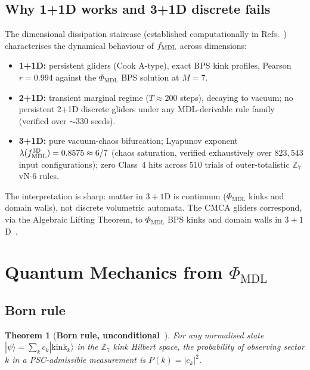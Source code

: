 \documentclass[11pt]{article}
\newtheorem{theorem}{Theorem}[section]
\theoremstyle{remark}
\newcommand{\PHIMDL}{\Phi_{\mathrm{MDL}}}
\newcommand{\ZS}{\mathbb{Z}_7}
\newcommand{\fmdl}{f_{\rm MDL}}
\begin{document}
\subsection{Why 1+1D works and 3+1D discrete fails}

The dimensional dissipation staircase (established computationally in
Refs.~\cite{SpivackCMCA,SpivackPhiMDLField}) characterises the dynamical
behaviour of $f_{\rm MDL}$ across dimensions:

\begin{itemize}[noitemsep]
\item \textbf{1+1D:} persistent gliders (Cook A-type), exact BPS kink
  profiles, Pearson $r = 0.994$ against the $\PHIMDL$ BPS solution at $M=7$.
\item \textbf{2+1D:} transient marginal regime ($T \approx 200$ steps),
  decaying to vacuum; no persistent 2+1D discrete gliders under any
  MDL-derivable rule family (verified over $\sim 330$ seeds).
\item \textbf{3+1D:} pure vacuum-chaos bifurcation; Lyapunov exponent
  $\lambda(\fmdl^{3\text{D}}) = 0.8575 \approx 6/7$ (chaos saturation,
  verified exhaustively over $823{,}543$ input configurations);
  zero Class~4 hits across 510 trials of outer-totalistic $\ZS$ vN-6 rules.
\end{itemize}

The interpretation is sharp: matter in $3+1$D is continuum ($\PHIMDL$ kinks
and domain walls), not discrete volumetric automata.  The CMCA gliders
correspond, via the Algebraic Lifting Theorem, to $\PHIMDL$ BPS kinks
and domain walls in $3+1$D~\cite{SpivackCMCA,SpivackPhiMDLField}.

\section{Quantum Mechanics from \texorpdfstring{$\PHIMDL$}{Phi-MDL}}
\label{sec:qm}

\subsection{Born rule}

\begin{theorem}[\textbf{Born rule, unconditional~\cite{SpivackPhiMDLField}}]
\label{thm:born}
For any normalised state $|\psi\rangle = \sum_k c_k |\text{kink}_k\rangle$
in the $\ZS$ kink Hilbert space, the probability of observing sector $k$
in a PSC-admissible measurement is $P(k) = |c_k|^2$.
\end{theorem}
\end{document}
